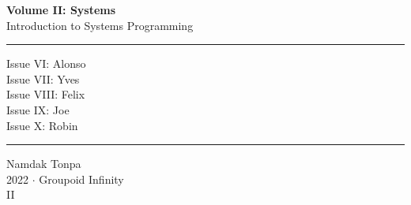 \documentclass{article}
\begin{document}
\begin{titlepage}
    \centering
    \vspace*{0.5in}
    \Huge
    \textbf{Volume II: Systems} \\
    \LARGE
    Introduction to Systems Programming \\
    \vspace{1.5in}
    \rule{\textwidth}{0.4pt}
    \flushleft
    \small
    Issue VI: Alonso \\
    Issue VII: Yves \\
    Issue VIII: Felix \\
    Issue IX: Joe \\
    Issue X: Robin \\
    \rule{\textwidth}{0.4pt}
    \centering
    \vfill
    \large
    Namdak Tonpa \\
    \Large
    2022 $\cdot$ Groupoid Infinity \\
    II
\end{titlepage}

\tableofcontents
\newif\ifincludeTOC
\includeTOCfalse
\newpage \begin{standalone}  \end{standalone} %
\newpage \begin{standalone}    \end{standalone} %
\newpage \begin{standalone}   \end{standalone} %
\newpage \begin{standalone}     \end{standalone} %
\newpage \begin{standalone}   \end{standalone} %
\end{document}

